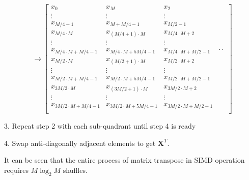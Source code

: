 \begin{equation*}
    \label{eq:matrix_trans_step_2}
    \rightarrow 
    \left[\begin{array}{c|c|c|c}
        x_0 & x_M & x_2 &  \\ 
        \vdots & \vdots & \vdots & \\
        x_{M/4-1} & x_{M+M/4-1} & x_{M/2-1} & \\
        x_{M/4\cdot M} & x_{(M/4+1)\cdot M} & x_{M/4\cdot M+2} &  \\
        \vdots & \vdots & \vdots & \\
        x_{M/4\cdot M+M/4-1} & x_{M/4\cdot M+5M/4-1} & x_{M/4\cdot M+M/2-1} & \cdot\cdot \\
        x_{M/2\cdot M} & x_{(M/2+1)\cdot M} & x_{M/2\cdot M+2} &  \\ 
        \vdots & \vdots & \vdots & \\
        x_{M/2\cdot M+M/4-1} & x_{M/2\cdot M+5M/4-1} & x_{M/2\cdot M+M/2-1} & \\
        x_{3M/2\cdot M} & x_{(3M/2+1)\cdot M} & x_{3M/2\cdot M+2} &  \\
        \vdots & \vdots & \vdots & \\
        x_{3M/2\cdot M+M/4-1} & x_{3M/2\cdot M+5M/4-1} & x_{3M/2\cdot M+M/2-1} & \\    
    \end{array}\right]
\end{equation*}

3. Repeat step 2 with each sub-quadrant until step 4 is ready

4. Swap anti-diagonally adjacent elements to get $\bm{X}^T$.

It can be seen that the entire process of matrix transpose in SIMD operation requires $M{\log_2}M$
shuffles.
